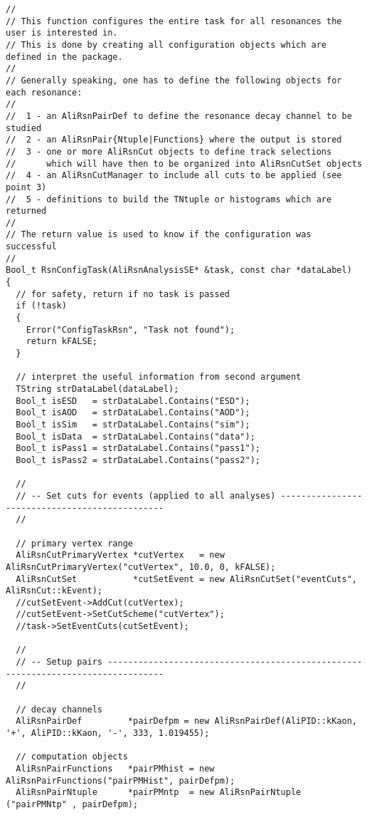 \documentclass[12pt,a4paper]{article}
\begin{document}
\begin{lstlisting}[frame=single]
//
// This function configures the entire task for all resonances the user is interested in.
// This is done by creating all configuration objects which are defined in the package.
//
// Generally speaking, one has to define the following objects for each resonance:
//
//  1 - an AliRsnPairDef to define the resonance decay channel to be studied
//  2 - an AliRsnPair{Ntuple|Functions} where the output is stored
//  3 - one or more AliRsnCut objects to define track selections
//      which will have then to be organized into AliRsnCutSet objects
//  4 - an AliRsnCutManager to include all cuts to be applied (see point 3)
//  5 - definitions to build the TNtuple or histograms which are returned
//
// The return value is used to know if the configuration was successful
//
Bool_t RsnConfigTask(AliRsnAnalysisSE* &task, const char *dataLabel)
{
  // for safety, return if no task is passed
  if (!task)
  {
    Error("ConfigTaskRsn", "Task not found");
    return kFALSE;
  }
  
  // interpret the useful information from second argument
  TString strDataLabel(dataLabel);
  Bool_t isESD   = strDataLabel.Contains("ESD");
  Bool_t isAOD   = strDataLabel.Contains("AOD");
  Bool_t isSim   = strDataLabel.Contains("sim");
  Bool_t isData  = strDataLabel.Contains("data");
  Bool_t isPass1 = strDataLabel.Contains("pass1");
  Bool_t isPass2 = strDataLabel.Contains("pass2");

  //
  // -- Set cuts for events (applied to all analyses) -----------------------------------------------
  //
  
  // primary vertex range
  AliRsnCutPrimaryVertex *cutVertex   = new AliRsnCutPrimaryVertex("cutVertex", 10.0, 0, kFALSE);
  AliRsnCutSet           *cutSetEvent = new AliRsnCutSet("eventCuts", AliRsnCut::kEvent);
  //cutSetEvent->AddCut(cutVertex);
  //cutSetEvent->SetCutScheme("cutVertex");
  //task->SetEventCuts(cutSetEvent);

  //
  // -- Setup pairs ---------------------------------------------------------------------------------
  //

  // decay channels
  AliRsnPairDef         *pairDefpm = new AliRsnPairDef(AliPID::kKaon, '+', AliPID::kKaon, '-', 333, 1.019455);

  // computation objects
  AliRsnPairFunctions   *pairPMhist = new AliRsnPairFunctions("pairPMHist", pairDefpm);
  AliRsnPairNtuple      *pairPMntp  = new AliRsnPairNtuple   ("pairPMNtp" , pairDefpm);


\end{lstlisting}
\end{document}
